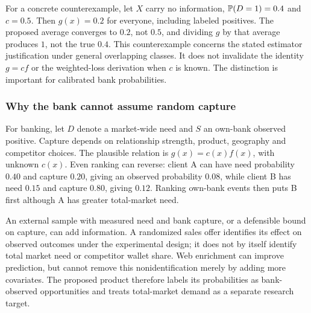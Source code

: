For a concrete counterexample, let $X$ carry no information, $\mathbb{P}(D=1)=0.4$ and $c=0.5$. Then $g(x)=0.2$ for everyone, including labeled positives. The proposed average converges to $0.2$, not $0.5$, and dividing $g$ by that average produces $1$, not the true $0.4$. This counterexample concerns the stated estimator justification under general overlapping classes. It does not invalidate the identity $g=cf$ or the weighted-loss derivation when $c$ is known. The distinction is important for calibrated bank probabilities.

\subsubsection{Why the bank cannot assume random capture}

For banking, let $D$ denote a market-wide need and $S$ an own-bank observed positive. Capture depends on relationship strength, product, geography and competitor choices. The plausible relation is $g(x)=c(x)f(x)$, with unknown $c(x)$. Even ranking can reverse: client A can have need probability $0.40$ and capture $0.20$, giving an observed probability $0.08$, while client B has need $0.15$ and capture $0.80$, giving $0.12$. Ranking own-bank events then puts B first although A has greater total-market need.

An external sample with measured need and bank capture, or a defensible bound on capture, can add information. A randomized sales offer identifies its effect on observed outcomes under the experimental design; it does not by itself identify total market need or competitor wallet share. Web enrichment can improve prediction, but cannot remove this nonidentification merely by adding more covariates. The proposed product therefore labels its probabilities as bank-observed opportunities and treats total-market demand as a separate research target.
